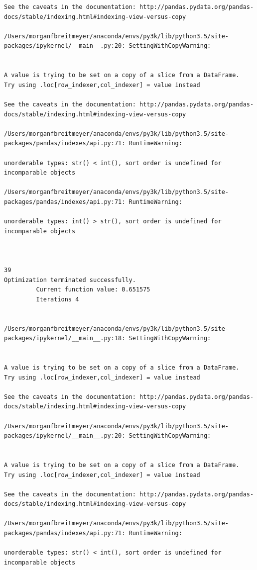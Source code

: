 \begin{lstlisting}
See the caveats in the documentation: http://pandas.pydata.org/pandas-docs/stable/indexing.html#indexing-view-versus-copy

/Users/morganfbreitmeyer/anaconda/envs/py3k/lib/python3.5/site-packages/ipykernel/__main__.py:20: SettingWithCopyWarning:


A value is trying to be set on a copy of a slice from a DataFrame.
Try using .loc[row_indexer,col_indexer] = value instead

See the caveats in the documentation: http://pandas.pydata.org/pandas-docs/stable/indexing.html#indexing-view-versus-copy

/Users/morganfbreitmeyer/anaconda/envs/py3k/lib/python3.5/site-packages/pandas/indexes/api.py:71: RuntimeWarning:

unorderable types: str() < int(), sort order is undefined for incomparable objects

/Users/morganfbreitmeyer/anaconda/envs/py3k/lib/python3.5/site-packages/pandas/indexes/api.py:71: RuntimeWarning:

unorderable types: int() > str(), sort order is undefined for incomparable objects



39
Optimization terminated successfully.
         Current function value: 0.651575
         Iterations 4


/Users/morganfbreitmeyer/anaconda/envs/py3k/lib/python3.5/site-packages/ipykernel/__main__.py:18: SettingWithCopyWarning:


A value is trying to be set on a copy of a slice from a DataFrame.
Try using .loc[row_indexer,col_indexer] = value instead

See the caveats in the documentation: http://pandas.pydata.org/pandas-docs/stable/indexing.html#indexing-view-versus-copy

/Users/morganfbreitmeyer/anaconda/envs/py3k/lib/python3.5/site-packages/ipykernel/__main__.py:20: SettingWithCopyWarning:


A value is trying to be set on a copy of a slice from a DataFrame.
Try using .loc[row_indexer,col_indexer] = value instead

See the caveats in the documentation: http://pandas.pydata.org/pandas-docs/stable/indexing.html#indexing-view-versus-copy

/Users/morganfbreitmeyer/anaconda/envs/py3k/lib/python3.5/site-packages/pandas/indexes/api.py:71: RuntimeWarning:

unorderable types: str() < int(), sort order is undefined for incomparable objects


\end{lstlisting}
